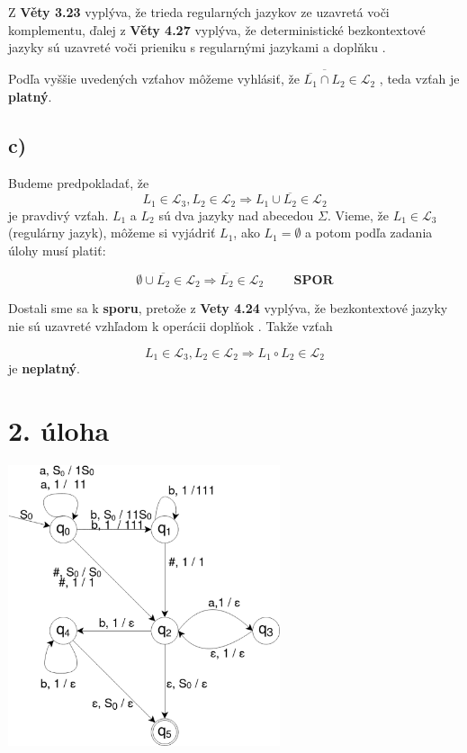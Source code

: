\documentclass[11pt,a4paper]{article}
\begin{document}
Z \textbf{Věty 3.23} vyplýva, že trieda regularných jazykov ze uzavretá voči komplementu, ďalej z \textbf{Věty 4.27} vyplýva, že deterministické bezkontextové jazyky sú uzavreté voči prieniku s regularnými jazykami a doplňku \cite{AA}.


Podľa vyššie uvedených vzťahov môžeme vyhlásiť, že $\overline{\overline{L_1} \cap L_2} \in \mathcal{L}_2$ , teda vzťah je \textbf{platný}.










\subsection{c)}

Budeme predpokladať, že
\begin{equation}
    L_1 \in \mathcal{L}_3, L_2 \in \mathcal{L}_2 \Rightarrow L_1 \cup \overline{L_2} \in \mathcal{L}_2
\end{equation}
je pravdivý vzťah. $L_1$ a $L_2$ sú dva jazyky nad abecedou $\Sigma$. Vieme, že $L_1 \in \mathcal{L}_3$(regulárny jazyk), môžeme si vyjádriť $L_1$, ako $L_1 = \emptyset$ a potom podľa zadania úlohy musí platiť:

\begin{equation}
\emptyset \cup \overline{L_2} \in \mathcal{L}_2 \Rightarrow \overline{L_2} \in \mathcal{L}_2 \hspace{1cm}\textbf{SPOR}
\end{equation}

Dostali sme sa k \textbf{sporu}, pretože z \textbf{Vety 4.24} vyplýva, že bezkontextové jazyky nie sú uzavreté vzhľadom k operácii doplňok \cite{AA}. Takže vzťah

\begin{equation}
L_1 \in \mathcal{L}_3, L_2 \in \mathcal{L}_2 \Rightarrow L_1 \circ L_2 \in \mathcal{L}_2
\end{equation}
je \textbf{neplatný}.

\newpage
\section{2. úloha}

\begin{center}
    \includegraphics[width=0.6\textwidth]{QFSMpng.eps}
\end{center}
\end{document}
